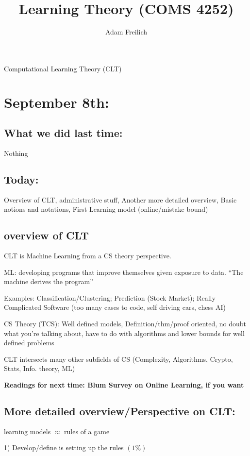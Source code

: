 \documentclass[10pt]{article}
\author{Adam Freilich}
\title{Learning Theory (COMS 4252)}
\begin{document}
Computational Learning Theory (CLT)

\section{September 8th:}

\subsection{What we did last time:} Nothing

\subsection{Today:} Overview of CLT, administrative stuff, Another more detailed overview, Basic notions and notations, First Learning model (online/mistake bound)

\subsection{overview of CLT} CLT is Machine Learning from a CS theory perspective.

ML: developing programs that improve themselves given exposure to data. ``The machine derives the program''

Examples: Classification/Clustering; Prediction (Stock Market); Really Complicated Software (too many cases to code, self driving cars, chess AI)

CS Theory (TCS): Well defined models, Definition/thm/proof oriented, no doubt what you're talking about, have to do with algorithms and lower bounds for well defined problems

CLT intersects many other subfields of CS (Complexity, Algorithms, Crypto, Stats, Info. theory, ML)

\textbf{Readings for next time: Blum Survey on Online Learning, if you want}

\subsection{More detailed overview/Perspective on CLT:}

learning models \(\approx\) rules of a game

1) Develop/define is setting up the rules \((1\%)\)
\end{document}
